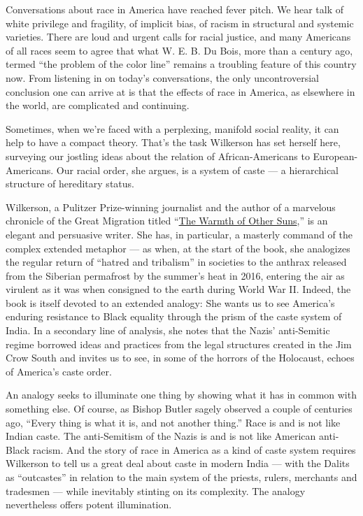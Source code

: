Conversations about race in America have reached fever pitch. We hear
talk of white privilege and fragility, of implicit bias, of racism in
structural and systemic varieties. There are loud and urgent calls for
racial justice, and many Americans of all races seem to agree that what
W. E. B. Du Bois, more than a century ago, termed ``the problem of the
color line'' remains a troubling feature of this country now. From
listening in on today's conversations, the only uncontroversial
conclusion one can arrive at is that the effects of race in America, as
elsewhere in the world, are complicated and continuing.

Sometimes, when we're faced with a perplexing, manifold social reality,
it can help to have a compact theory. That's the task Wilkerson has set
herself here, surveying our jostling ideas about the relation of
African-Americans to European-Americans. Our racial order, she argues,
is a system of caste --- a hierarchical structure of hereditary status.

Wilkerson, a Pulitzer Prize-winning journalist and the author of a
marvelous chronicle of the Great Migration titled
``\href{https://www.nytimes3xbfgragh.onion/2010/09/09/books/09wilkerson.html?searchResultPosition=4https://www.nytimes3xbfgragh.onion/2010/09/05/books/review/Oshinsky-t.html?searchResultPosition=18}{The
Warmth of Other Suns},'' is an elegant and persuasive writer. She has,
in particular, a masterly command of the complex extended metaphor ---
as when, at the start of the book, she analogizes the regular return of
``hatred and tribalism'' in societies to the anthrax released from the
Siberian permafrost by the summer's heat in 2016, entering the air as
virulent as it was when consigned to the earth during World War II.
Indeed, the book is itself devoted to an extended analogy: She wants us
to see America's enduring resistance to Black equality through the prism
of the caste system of India. In a secondary line of analysis, she notes
that the Nazis' anti-Semitic regime borrowed ideas and practices from
the legal structures created in the Jim Crow South and invites us to
see, in some of the horrors of the Holocaust, echoes of America's caste
order.

An analogy seeks to illuminate one thing by showing what it has in
common with something else. Of course, as Bishop Butler sagely observed
a couple of centuries ago, ``Every thing is what it is, and not another
thing.'' Race is and is not like Indian caste. The anti-Semitism of the
Nazis is and is not like American anti-Black racism. And the story of
race in America as a kind of caste system requires Wilkerson to tell us
a great deal about caste in modern India --- with the Dalits as
``outcastes'' in relation to the main system of the priests, rulers,
merchants and tradesmen --- while inevitably stinting on its complexity.
The analogy nevertheless offers potent illumination.

